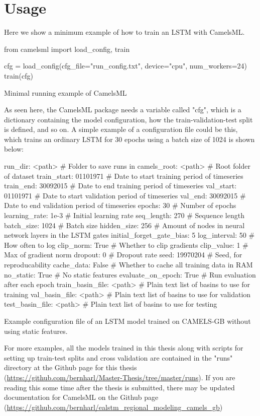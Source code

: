 \section{Usage}
Here we show a minimum example of how to train an LSTM with CamelsML. 
\begin{listing}
\begin{pythoncode}
from camelsml import load_config, train

cfg = load_config(cfg_file="run_config.txt", device="cpu", num_workers=24)
train(cfg)
\end{pythoncode}
    \caption{Minimal running example of CamelsML}
\end{listing}
As seen here, the CamelsML package needs a variable called "cfg", which is a dictionary 
containing the model configuration, how the train-validation-test split is defined, 
and so on. 
A simple example of a configuration file could be this, which trains an ordinary 
LSTM for 30 epochs using a batch size of 1024 is shown below:
\begin{listing}
\begin{cfgcode}
run_dir: <path> # Folder to save runs in
camels_root: <path> # Root folder of dataset
train_start: 01101971 # Date to start training period of timeseries
train_end: 30092015 # Date to end training period of timeseries
val_start: 01101971 # Date to start validation period of timeseries
val_end: 30092015 # Date to end validation period of timeseries
epochs: 30 # Number of epochs
learning_rate: 1e-3 # Initial learning rate
seq_length: 270 # Sequence length
batch_size: 1024 # Batch size
hidden_size:  256 # Amount of nodes in neural network layers in the LSTM gates
initial_forget_gate_bias: 5 
log_interval: 50 # How often to log
clip_norm: True # Whether to clip gradients
clip_value: 1 # Max of gradient norm
dropout: 0 # Dropout rate
seed: 19970204 # Seed, for reproducability 
cache_data: False # Whether to cache all training data in RAM
no_static: True # No static features
evaluate_on_epoch: True # Run evaluation after each epoch
train_basin_file: <path> # Plain text list of basins to use for training 
val_basin_file:  <path> # Plain text list of basins to use for validation
test_basin_file: <path> # Plain text list of basins to use for testing
\end{cfgcode}
\caption{Example configuration file of an LSTM model trained on CAMELS-GB without using static features.}
\end{listing}
For more examples, all the models trained in this thesis along with scripts for 
setting up train-test splits and cross validation are contained in the "runs" directory at the 
Github page for this thesis (\url{https://github.com/bernharl/Master-Thesis/tree/master/runs}).
If you are reading this some time after the thesis is submitted, there may be updated 
documentation for CamelsML on the Github page (\url{https://github.com/bernharl/ealstm_regional_modeling_camels_gb})
